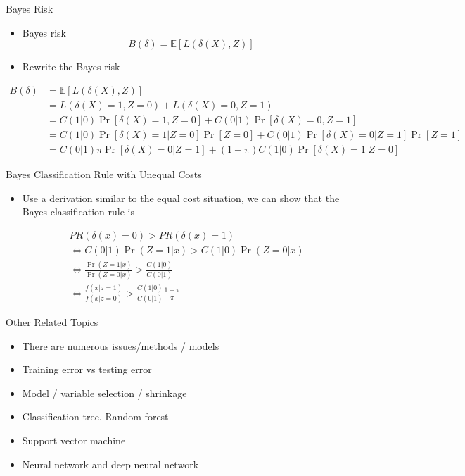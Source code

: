 \documentclass[
  ignorenonframetext,
]{beamer}
\providecommand{\tightlist}{%
  \setlength{\itemsep}{0pt}\setlength{\parskip}{0pt}}
\begin{document}
\begin{frame}{Bayes Risk}
\protect\hypertarget{bayes-risk-1}{}
\begin{itemize}
\tightlist
\item
  Bayes risk \[B(\delta)=\mathbb E [L(\delta(X), Z)]\]
\item
  Rewrite the Bayes risk
\end{itemize}

\tiny

\[\begin{aligned}
B(\delta) &=\mathbb E [L(\delta(X), Z)]\\
&=L(\delta(X)=1, Z=0) + L(\delta(X)=0, Z=1)\\
&=C(1|0)\Pr [\delta(X)=1, Z=0] + C(0|1)\Pr [\delta(X)=0, Z=1]\\
&=C(1|0)\Pr [\delta(X)=1| Z=0]\Pr[Z=0] + C(0|1)\Pr [\delta(X)=0| Z=1] \Pr[Z=1]\\
&=C(0|1)\pi \Pr [\delta(X)=0| Z=1]+ (1-\pi)C(1|0)\Pr [\delta(X)=1| Z=0]
\end{aligned}\] \normalsize
\end{frame}

\begin{frame}{Bayes Classification Rule with Unequal Costs}
\protect\hypertarget{bayes-classification-rule-with-unequal-costs}{}
\begin{itemize}
\tightlist
\item
  Use a derivation similar to the equal cost situation, we can show that
  the Bayes classification rule is
\end{itemize}

\[\begin{aligned}
&PR(\delta(x)=0)>PR(\delta(x)=1) \\
&\Leftrightarrow C(0|1)\Pr(Z=1|x)> C(1|0)\Pr(Z=0|x)\\
&\Leftrightarrow \frac{\Pr(Z=1|x)}{\Pr(Z=0|x)}>\frac{C(1|0)}{C(0|1)}\\
&\Leftrightarrow \frac{f(x|z=1)}{f(x|z=0)}>\frac{C(1|0)}{C(0|1)}\frac{1-\pi}{\pi}
\end{aligned}\]
\end{frame}

\begin{frame}{Other Related Topics}
\protect\hypertarget{other-related-topics}{}
\begin{itemize}
\tightlist
\item
  There are numerous issues/methods / models
\item
  Training error vs testing error
\item
  Model / variable selection / shrinkage
\item
  Classification tree. Random forest
\item
  Support vector machine
\item
  Neural network and deep neural network
\end{itemize}
\end{frame}
\end{document}
